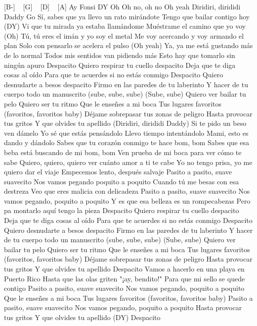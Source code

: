 [B-] ~ [G] ~ [D] ~ [A]
Ay
Fonsi
DY
Oh
Oh no, oh no
Oh yeah
Diridiri, dirididi Daddy
Go
Sí, sabes que ya llevo un rato mirándote
Tengo que bailar contigo hoy (DY)
Vi que tu mirada ya estaba llamándome
Muéstrame el camino que yo voy (Oh)
Tú, tú eres el imán y yo soy el metal
Me voy acercando y voy armando el plan
Solo con pensarlo se acelera el pulso (Oh yeah)
Ya, ya me está gustando más de lo normal
Todos mis sentidos van pidiendo más
Esto hay que tomarlo sin ningún apuro
Despacito
Quiero respirar tu cuello despacito
Deja que te diga cosas al oído
Para que te acuerdes si no estás conmigo
Despacito
Quiero desnudarte a besos despacito
Firmo en las paredes de tu laberinto
Y hacer de tu cuerpo todo un manuscrito (sube, sube, sube)
(Sube, sube)
Quiero ver bailar tu pelo
Quiero ser tu ritmo
Que le enseñes a mi boca
Tus lugares favoritos (favoritos, favoritos baby)
Déjame sobrepasar tus zonas de peligro
Hasta provocar tus gritos
Y que olvides tu apellido (Diridiri, dirididi Daddy)
Si te pido un beso ven dámelo
Yo sé que estás pensándolo
Llevo tiempo intentándolo
Mami, esto es dando y dándolo
Sabes que tu corazón conmigo te hace bom, bom
Sabes que esa beba está buscando de mi bom, bom
Ven prueba de mi boca para ver cómo te sabe
Quiero, quiero, quiero ver cuánto amor a ti te cabe
Yo no tengo prisa, yo me quiero dar el viaje
Empecemos lento, después salvaje
Pasito a pasito, suave suavecito
Nos vamos pegando poquito a poquito
Cuando tú me besas con esa destreza
Veo que eres malicia con delicadeza
Pasito a pasito, suave suavecito
Nos vamos pegando, poquito a poquito
Y es que esa belleza es un rompecabezas
Pero pa montarlo aquí tengo la pieza
Despacito
Quiero respirar tu cuello despacito
Deja que te diga cosas al oído
Para que te acuerdes si no estás conmigo
Despacito
Quiero desnudarte a besos despacito
Firmo en las paredes de tu laberinto
Y hacer de tu cuerpo todo un manuscrito (sube, sube, sube)
(Sube, sube)
Quiero ver bailar tu pelo
Quiero ser tu ritmo
Que le enseñes a mi boca
Tus lugares favoritos (favoritos, favoritos baby)
Déjame sobrepasar tus zonas de peligro
Hasta provocar tus gritos
Y que olvides tu apellido
Despacito
Vamos a hacerlo en una playa en Puerto Rico
Hasta que las olas griten "¡ay, bendito!"
Para que mi sello se quede contigo
Pasito a pasito, suave suavecito
Nos vamos pegando, poquito a poquito
Que le enseñes a mi boca
Tus lugares favoritos (favoritos, favoritos baby)
Pasito a pasito, suave suavecito
Nos vamos pegando, poquito a poquito
Hasta provocar tus gritos
Y que olvides tu apellido (DY)
Despacito